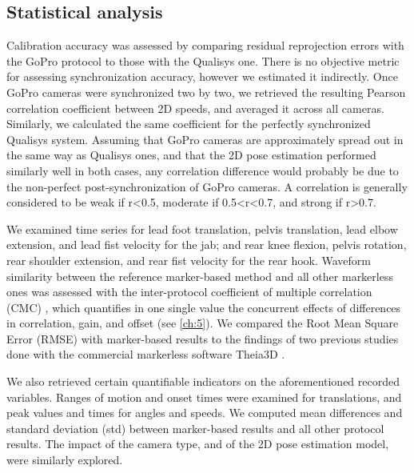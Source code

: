 \subsection{Statistical analysis}

Calibration accuracy was assessed by comparing residual reprojection errors with the GoPro protocol to those with the Qualisys one. There is no objective metric for assessing synchronization accuracy, however we estimated it indirectly. Once GoPro cameras were synchronized two by two, we retrieved the resulting Pearson correlation coefficient between 2D speeds, and averaged it across all cameras. Similarly, we calculated the same coefficient for the perfectly synchronized Qualisys system. Assuming that GoPro cameras are approximately spread out in the same way as Qualisys ones, and that the 2D pose estimation performed similarly well in both cases, any correlation difference would probably be due to the non-perfect post-synchronization of GoPro cameras. A correlation is generally considered to be weak if r<0.5, moderate if 0.5<r<0.7, and strong if r>0.7.

We examined time series for lead foot translation, pelvis translation, lead elbow extension, and lead fist velocity for the jab; and rear knee flexion, pelvis rotation, rear shoulder extension, and rear fist velocity for the rear hook. 
Waveform similarity between the reference marker-based method and all other markerless ones was assessed with the inter-protocol coefficient of multiple correlation (CMC) \cite{Ferrari2010}, which quantifies in one single value the concurrent effects of differences in correlation, gain, and offset (see  \autoref{ch:5}). We compared the Root Mean Square Error (RMSE) with marker-based results to the findings of two previous studies done with the commercial markerless software Theia3D \cite{Kanko2021b}.

\newpage
We also retrieved certain quantifiable indicators on the aforementioned recorded variables. Ranges of motion and onset times were examined for translations, and peak values and times for angles and speeds. 
We computed mean differences and standard deviation (std) between marker-based results and all other protocol results. The impact of the camera type, and of the 2D pose estimation model, were similarly explored. 

